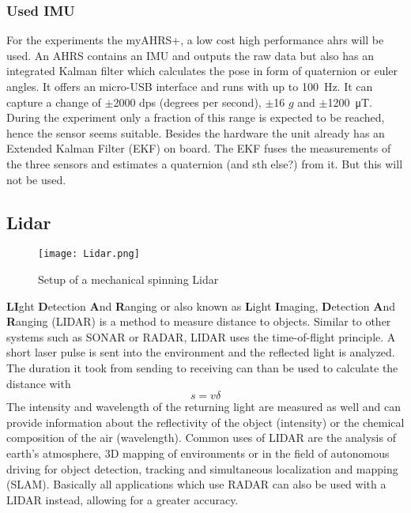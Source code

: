 \subsubsection{Used IMU}
For the experiments the myAHRS+, a low cost high performance \gls{ahrs} will be used.
An AHRS contains an IMU and outputs the raw data but also has an integrated Kalman filter which calculates the pose in form of quaternion or euler angles.
It offers an micro-USB interface and runs with up to \SI{100}{\Hz}.
It can capture a change of $\pm$2000 dps (degrees per second), $\pm$16 $g$ and $\pm$\SI{1200}{\micro\tesla}.
During the experiment only a fraction of this range is expected to be reached, hence the sensor seems suitable.
Besides the hardware the unit already has an Extended Kalman Filter (EKF) on board.
The EKF fuses the measurements of the three sensors and estimates a quaternion (and sth else?) from it.
But this will not be used.

\subsection{Lidar}
\begin{figure}[htb]
	\centering
	\texttt{[image: Lidar.png]}
	\caption{Setup of a mechanical spinning Lidar \cite{Li2020}}
	\label{fig:lidar}
\end{figure}
\textbf{LI}ght \textbf{D}etection \textbf{A}nd \textbf{R}anging or also known as \textbf{L}ight \textbf{I}maging, \textbf{D}etection \textbf{A}nd \textbf{R}anging (LIDAR) is a method to measure distance to objects.
Similar to other systems such as SONAR or RADAR, LIDAR uses the time-of-flight principle.
A short laser pulse is sent into the environment and the reflected light is analyzed.
The duration it took from sending to receiving can than be used to calculate the distance with 
\[ s = v\delta \]
The intensity and wavelength of the returning light are measured as well and can provide information about the reflectivity of the object (intensity) or the chemical composition of the air (wavelength).
Common uses of LIDAR are the analysis of earth's atmosphere, 3D mapping of environments or in the field of autonomous driving for object detection, tracking and simultaneous localization and mapping (SLAM).
Basically all applications which use RADAR can also be used with a LIDAR instead, allowing for a greater accuracy.

